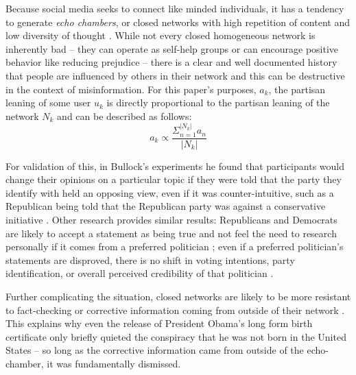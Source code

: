  Because social media seeks to connect like minded individuals, it has a tendency to generate \textit{echo chambers}, or closed networks with high repetition of content and low diversity of thought \citep{adibi2005proceedings, bastian2009international, pariser2011filter,bozdag2015breaking}. While not every closed homogeneous network is inherently bad -- they can operate as self-help groups \citep{kast2012under} or can encourage positive behavior like reducing prejudice \citep{paluck2011peer} -- there is a clear and well documented history that people are influenced by others in their network \citep{bollinger2012peer, bond201261,gerber2008social,gerber2009descriptive,meer2011brother,paluck2012salience,del2016spreading,bessi2015viral} and this can be destructive in the context of misinformation. For this paper's purposes, $a_k$, the partisan leaning of some user $u_k$ is directly proportional to the partisan leaning of the network $N_k$ and can be described as follows:
 \begin{equation}
    \label{leaningproportionaltonetwork}
     a_k \propto \frac{\Sigma_{n=1}^{|N_k|}{a_n}}{|N_k|}
 \end{equation}
 
 For validation of this, in Bullock's experiments he found that participants would change their opinions on a particular topic if they were told that the party they identify with held an opposing view, even if it was counter-intuitive, such as a Republican being told that the Republican party was against a conservative initiative \citep{bullock2007experiments}. Other research provides similar results: Republicans and Democrats are likely to accept a statement as being true and not feel the need to research personally if it comes from a preferred politician \cite{housholder2014facebook}; even if a preferred politician's statements are disproved, there is no shift in voting intentions, party identification, or overall perceived credibility of that politician \citep{swire2017processing}. 
 
 Further complicating the situation, closed networks are likely to be more resistant to fact-checking or corrective information coming from outside of their network \citep{garrett2013undermining,lord1979biased,edwards1996disconfirmation,redlawsk2002hot, taber2006motivated}. This explains why even the release of President Obama's long form birth certificate only briefly quieted the conspiracy that he was not born in the United States \citep{nyhan2012new} -- so long as the corrective information came from outside of the echo-chamber, it was fundamentally dismissed.
 
